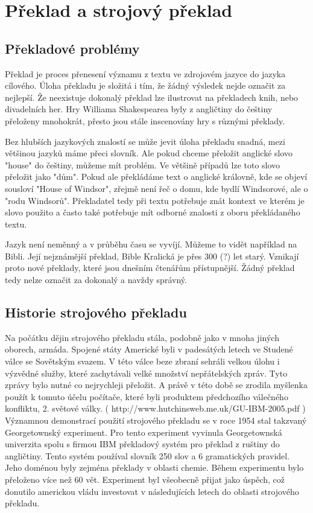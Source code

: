 
\chapter{Překlad a strojový překlad}

\section{Překladové problémy}

Překlad je proces přenesení významu z textu ve zdrojovém jazyce do jazyka cílového. Úloha překladu je složitá i tím, že žádný výsledek nejde označit za nejlepší. Že neexistuje dokonalý překlad lze ilustrovat na překladech knih, nebo divadelních her. Hry Williama Shakespearea byly z angličtiny do češtiny přeloženy mnohokrát, přesto jsou stále inscenovány hry s různými překlady.

Bez hlubších jazykových znalostí se může jevit úloha překladu snadná, mezi většinou jazyků máme přeci slovník. Ale pokud chceme přeložit anglické slovo "house" do češtiny, můžeme mít problém. Ve většině případů lze toto slovo přeložit jako "dům". Pokud ale překládáme text o anglické královně, kde se objeví sousloví "House of Windsor", zřejmě není řeč o domu, kde bydlí Windsorové, ale o "rodu Windsorů". Překladatel tedy při textu potřebuje znát kontext ve kterém je slovo použito a často také potřebuje mít odborné znalosti z oboru překládaného textu.

Jazyk není neměnný a v průběhu času se vyvíjí. Můžeme to vidět například na Bibli. Její nejznámější překlad, Bible Kralická je přes 300 (?) let starý. Vznikají proto nové překlady, které jsou dnešním čtenářům přístupnější. Žádný překlad tedy nelze označit za dokonalý a navždy správný.

\section{Historie strojového překladu}

Na počátku dějin strojového překladu stála, podobně jako v mnoha jiných oborech, armáda. Spojené státy Americké byli v padesátých letech ve Studené válce se Sovětským svazem. V této válce beze zbraní sehráli velkou úlohu i výzvědné služby, které zachytávali velké množství nepřátelských zpráv. Tyto zprávy bylo nutné co nejrychleji přeložit. A právě v této době se zrodila myšlenka použít k tomuto účelu počítače, které byli produktem předchozího válečného konfliktu, 2. světové války. ( http://www.hutchinsweb.me.uk/GU-IBM-2005.pdf ) Významnou demonstrací použití strojového překladu se v roce 1954 stal takzvaný Georgetownský experiment. Pro tento experiment vyvinula Georgetownská univerzita spolu s firmou IBM překladový systém pro překlad z ruštiny do angličtiny. Tento systém používal slovník 250 slov a 6 gramatických pravidel. Jeho doménou byly zejména překlady v oblasti chemie. Během experimentu bylo přeloženo více než 60 vět. Experiment byl všeobecně přijat jako úspěch, což donutilo americkou vládu investovat v následujících letech do oblasti strojového překladu.

